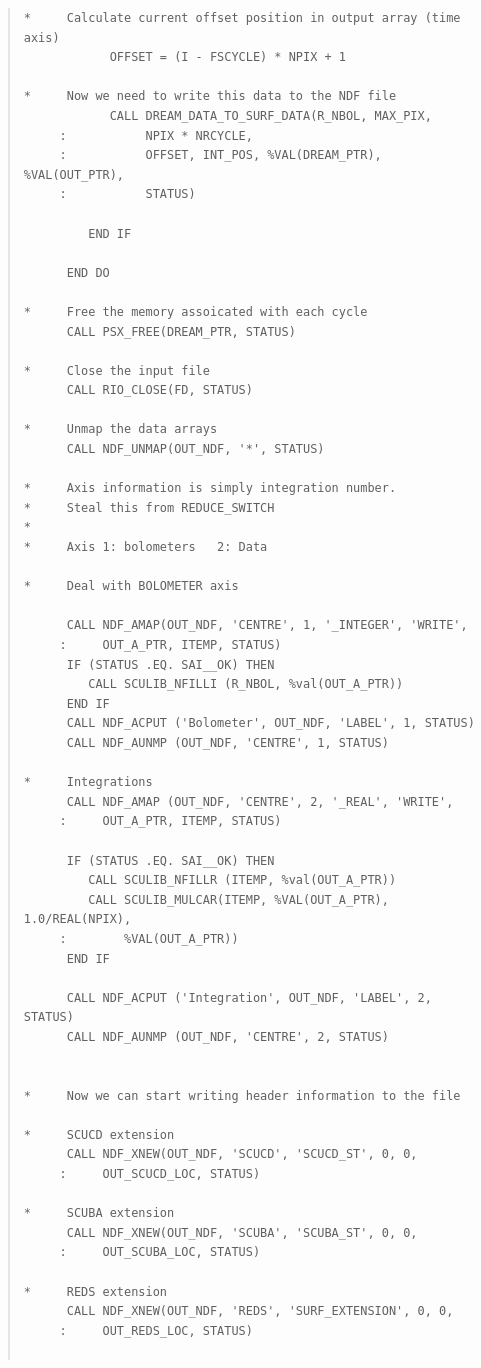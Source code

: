 \documentclass[twoside,11pt]{article}
\newenvironment{myquote}{\begin{quote}\begin{small}}{\end{small}\end{quote}}
\renewcommand{\_}{\texttt{\symbol{95}}}
\begin{document}
\begin{myquote}
\begin{verbatim}
*     Calculate current offset position in output array (time axis)
            OFFSET = (I - FSCYCLE) * NPIX + 1

*     Now we need to write this data to the NDF file
            CALL DREAM_DATA_TO_SURF_DATA(R_NBOL, MAX_PIX,
     :           NPIX * NRCYCLE,
     :           OFFSET, INT_POS, %VAL(DREAM_PTR), %VAL(OUT_PTR),
     :           STATUS)

         END IF

      END DO

*     Free the memory assoicated with each cycle
      CALL PSX_FREE(DREAM_PTR, STATUS)

*     Close the input file
      CALL RIO_CLOSE(FD, STATUS)

*     Unmap the data arrays
      CALL NDF_UNMAP(OUT_NDF, '*', STATUS)

*     Axis information is simply integration number.
*     Steal this from REDUCE_SWITCH
*
*     Axis 1: bolometers   2: Data

*     Deal with BOLOMETER axis

      CALL NDF_AMAP(OUT_NDF, 'CENTRE', 1, '_INTEGER', 'WRITE',
     :     OUT_A_PTR, ITEMP, STATUS)
      IF (STATUS .EQ. SAI__OK) THEN
         CALL SCULIB_NFILLI (R_NBOL, %val(OUT_A_PTR))
      END IF
      CALL NDF_ACPUT ('Bolometer', OUT_NDF, 'LABEL', 1, STATUS)
      CALL NDF_AUNMP (OUT_NDF, 'CENTRE', 1, STATUS)

*     Integrations
      CALL NDF_AMAP (OUT_NDF, 'CENTRE', 2, '_REAL', 'WRITE',
     :     OUT_A_PTR, ITEMP, STATUS)

      IF (STATUS .EQ. SAI__OK) THEN
         CALL SCULIB_NFILLR (ITEMP, %val(OUT_A_PTR))
         CALL SCULIB_MULCAR(ITEMP, %VAL(OUT_A_PTR), 1.0/REAL(NPIX),
     :        %VAL(OUT_A_PTR))
      END IF

      CALL NDF_ACPUT ('Integration', OUT_NDF, 'LABEL', 2, STATUS)
      CALL NDF_AUNMP (OUT_NDF, 'CENTRE', 2, STATUS)


*     Now we can start writing header information to the file

*     SCUCD extension
      CALL NDF_XNEW(OUT_NDF, 'SCUCD', 'SCUCD_ST', 0, 0,
     :     OUT_SCUCD_LOC, STATUS)

*     SCUBA extension
      CALL NDF_XNEW(OUT_NDF, 'SCUBA', 'SCUBA_ST', 0, 0,
     :     OUT_SCUBA_LOC, STATUS)

*     REDS extension
      CALL NDF_XNEW(OUT_NDF, 'REDS', 'SURF_EXTENSION', 0, 0,
     :     OUT_REDS_LOC, STATUS)


\end{verbatim}
\end{myquote}
\end{document}
